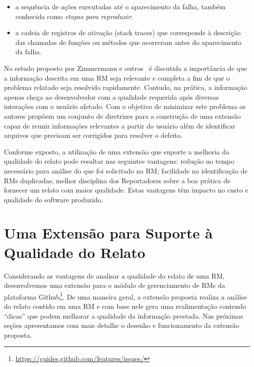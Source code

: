 \begin{itemize}
    \item a sequência de ações executadas até o aparecimento da falha, também
        conhecida como \textit{etapas para reproduzir};
    \item a cadeia de registros de ativação (stack traces) que corresponde à
        descrição das chamadas de funções ou métodos que ocorreram antes do
        aparecimento da falha.
\end{itemize}

No estudo proposto por Zimmermann e outros~\cite{5070993} é discutida a
importância de que a informação descrita em uma RM seja relevante e completa a
fim de que o problema relatado seja resolvido rapidamente.  Contudo, na prática,
a informação apenas chega ao desenvolvedor com a qualidade requerida após
diversas interações com o usuário afetado. Com o objetivo de minimizar este
problema os autores propõem um conjunto de diretrizes para a construção de uma
extensão capaz de reunir informações relevantes a partir do usuário além de
identificar arquivos que precisam ser corrigidos para resolver o defeito.

Conforme exposto, a utilização de uma extensão que suporte a melhoria da
qualidade do relato pode resultar nas seguintes vantagens: redução no tempo
necessário para análise do que foi solicitado na RM\@; facilidade na
identificação de RMs duplicadas; melhor disciplina dos Reportadores sobre a boa
prática de fornecer um relato com maior qualidade. Estas vantagens têm impacto
no custo e qualidade do software produzido.

\section{Uma Extensão para Suporte à Qualidade do Relato}
\label{sec:uma_extensao_suporte_qualidade_relato}

Considerando as vantagens de analisar a qualidade do relato de uma RM,
desenvolvemos uma extensão para o módulo de gerenciamento de RMs da plataforma
Github\footnote{\url{https://guides.github.com/features/issues/}}. De uma
maneira geral, a extensão proposta realiza a análise do relato contido em uma RM
e com base nele gera uma realimentação contendo ``dicas'' que podem melhorar a
qualidade da informação prestada. Nas próximas seções apresentamos com mais
detalhe o desenho e funcionamento da extensão proposta.


